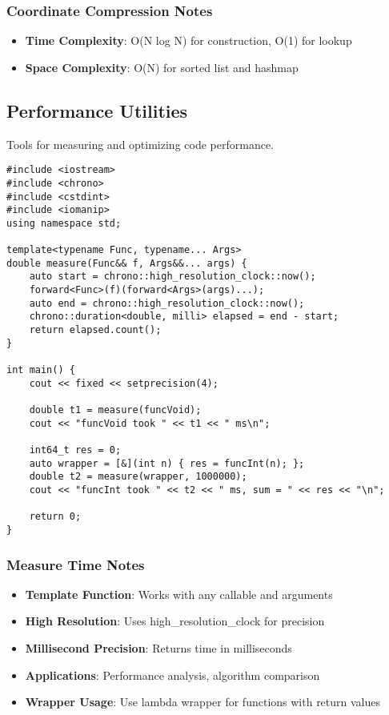 \documentclass[11pt,a4paper]{article}
\begin{document}
\subsubsection*{Coordinate Compression Notes}
\begin{itemize}
\item \textbf{Time Complexity}: O(N log N) for construction, O(1) for lookup
\item \textbf{Space Complexity}: O(N) for sorted list and hashmap
\end{itemize}

\newpage

\subsection{Performance Utilities}
Tools for measuring and optimizing code performance.

\begin{lstlisting}[caption={Measure Time Utility}]
#include <iostream>
#include <chrono>
#include <cstdint>
#include <iomanip>  
using namespace std;

template<typename Func, typename... Args>
double measure(Func&& f, Args&&... args) {
    auto start = chrono::high_resolution_clock::now();
    forward<Func>(f)(forward<Args>(args)...);
    auto end = chrono::high_resolution_clock::now();
    chrono::duration<double, milli> elapsed = end - start;
    return elapsed.count();
}

int main() {
    cout << fixed << setprecision(4);

    double t1 = measure(funcVoid);
    cout << "funcVoid took " << t1 << " ms\n";

    int64_t res = 0;
    auto wrapper = [&](int n) { res = funcInt(n); };
    double t2 = measure(wrapper, 1000000);
    cout << "funcInt took " << t2 << " ms, sum = " << res << "\n";

    return 0;
}
\end{lstlisting}

\subsubsection*{Measure Time Notes}
\begin{itemize}
\item \textbf{Template Function}: Works with any callable and arguments
\item \textbf{High Resolution}: Uses high\_resolution\_clock for precision
\item \textbf{Millisecond Precision}: Returns time in milliseconds
\item \textbf{Applications}: Performance analysis, algorithm comparison
\item \textbf{Wrapper Usage}: Use lambda wrapper for functions with return values
\end{itemize}
\end{document}
